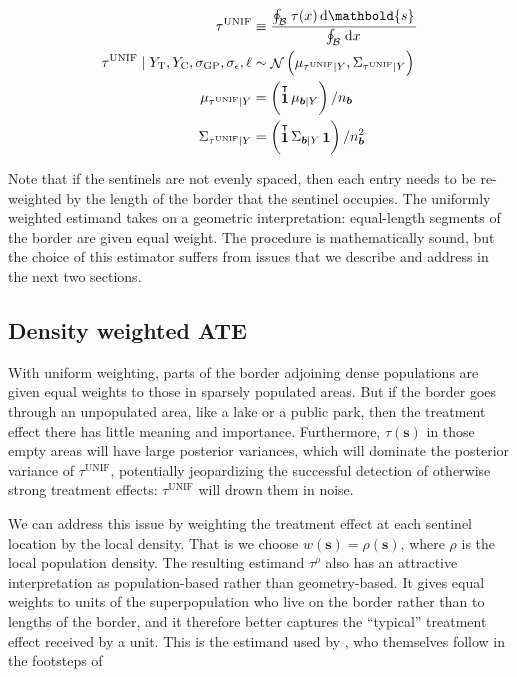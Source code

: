 \documentclass[letter]{article}
\DeclareMathOperator{\normal}{\mathcal{N}}
\DeclareMathOperator{\ones}{\mathbf{1}}
\newcommand{\trans}{^{\intercal}}
\newcommand{\treat}{\mathrm{T}}
\newcommand{\ctrol}{\mathrm{C}}
\newcommand{\sigmaf}{\sigma_{\mathrm{GP}}}
\newcommand{\sigman}{\sigma_{\epsilon}}
\newcommand{\svec}{\mathbold{s}}
\newcommand{\boundary}{\mathcal{B}}
\newcommand{\sentinels}{\bm{b}}
\newcommand{\unifavg}{\tau^{\mathrm{UNIF}}}
\newcommand{\taurho}{\tau^{\rho}}
\newcommand{\eqlabel}[1]{\label{#1}}
\newcommand{\numsent}{n_{\sentinels}}
\renewcommand{\cite}[1]{\citep{#1}}
\begin{document}
\begin{equation}\begin{split}
    \unifavg &\equiv \frac{\oint_\boundary \left. \tau(x) \dif \svec \right.}
                          {\oint_\boundary \left. \dif x \right.} \\
    \unifavg \mid Y_\treat{}, Y_\ctrol{}, \sigmaf, \sigman, \ell &\sim \normal\del{\mu_{\unifavg \mid Y}, \Sigma_{\unifavg \mid Y}} \\
    \mu_{\unifavg \mid Y} &= \del{\ones\trans \mu_{\sentinels \mid Y}} / \numsent \\
    \Sigma_{\unifavg \mid Y} &= \del{\ones\trans \Sigma_{\sentinels \mid Y} \ones} / \numsent^2
\end{split}
\eqlabel{eq:unifavg}
\end{equation}

Note that if the sentinels are not evenly spaced, then each entry needs to be re-weighted by the length of the border that the sentinel occupies.
The uniformly weighted estimand takes on a geometric interpretation: equal-length segments of the border are given equal weight.
The procedure is mathematically sound, but the choice of this estimator suffers from issues that we describe and address in the next two sections.
    


    	\subsection{Density weighted ATE}\label{density-weighted-ate}

With uniform weighting, parts of the border adjoining dense populations are given equal weights to those in sparsely populated areas.
But if the border goes through an unpopulated area, like a lake or a public park, then the treatment effect there has little meaning and importance.
Furthermore, \(\tau(\svec)\) in those empty areas will have large posterior variances, which will dominate the posterior variance of \(\unifavg\), potentially jeopardizing the successful detection of otherwise strong treatment effects: \(\unifavg\) will drown them in noise.

We can address this issue by weighting the treatment effect at each sentinel location by the local density.
That is we choose \(w(\svec) = \rho(\svec)\), where \(\rho\) is the local population density.
The resulting estimand \(\taurho\) also has an attractive interpretation as population-based rather than geometry-based.
It gives equal weights to units of the superpopulation who live on the border rather than to lengths of the border,
and it therefore better captures the ``typical'' treatment effect received by a unit.
This is the estimand used by \cite{keele_titiunik_2015}, who themselves follow in the footsteps of \cite{imbens2011regression}
    
\end{document}
